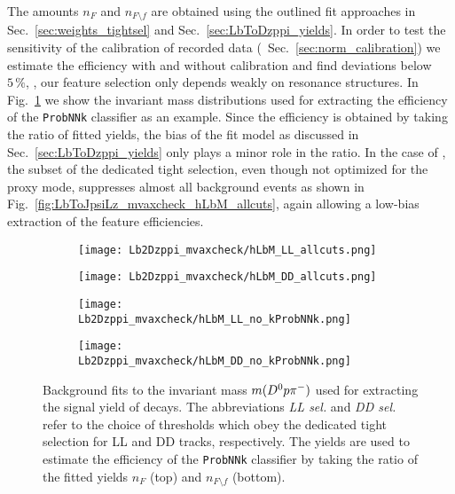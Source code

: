 The amounts $n_F$ and $n_{F \setminus f}$ are obtained using the outlined fit approaches in Sec.~\ref{sec:weights_tightsel} and Sec.~\ref{sec:LbToDzppi_yields}.
In order to test the sensitivity of the calibration of recorded \decay{\Lb}{\Dz\proton\pim} data (\cf{}~Sec.~\ref{sec:norm_calibration}) we estimate the efficiency with and without calibration and find deviations below $5\,\%$, \ie{}, our feature selection only depends weakly on resonance structures.
In Fig.~\ref{fig:LbToDzppi_mvaxcheck_hLbM} we show the invariant mass distributions used for extracting the efficiency of the \texttt{ProbNNk} classifier as an example.
Since the efficiency is obtained by taking the ratio of fitted yields, the bias of the fit model as discussed in Sec.~\ref{sec:LbToDzppi_yields} only plays a minor role in the ratio.
In the case of \decay{\Lb}{\jpsi\Lz}, the subset of the dedicated \decay{\Lb}{\Dz\Lz} tight selection, even though not optimized for the proxy mode, suppresses almost all background events as shown in Fig.~\ref{fig:LbToJpsiLz_mvaxcheck_hLbM_allcuts}, again allowing a low-bias extraction of the feature efficiencies.
\begin{figure}[htbp]
    \centering
    \begin{subfigure}{.49\textwidth}
        \centering
        \texttt{[image: Lb2Dzppi\_mvaxcheck/hLbM\_LL\_allcuts.png]}
    \end{subfigure}
    \begin{subfigure}{.49\textwidth}
        \centering
        \texttt{[image: Lb2Dzppi\_mvaxcheck/hLbM\_DD\_allcuts.png]}
    \end{subfigure}
    \par\bigskip 
    \begin{subfigure}{.49\textwidth}
        \centering
        \texttt{[image: Lb2Dzppi\_mvaxcheck/hLbM\_LL\_no\_kProbNNk.png]}
    \end{subfigure}
    \begin{subfigure}{.49\textwidth}
        \centering
        \texttt{[image: Lb2Dzppi\_mvaxcheck/hLbM\_DD\_no\_kProbNNk.png]}
    \end{subfigure}
    \caption{Background fits to the invariant mass $m({{D}^0}{p}{{\pi}^-})$ used for extracting the signal yield of \decay{\Lb}{\Dz\proton\pim} decays. The abbreviations \textit{LL sel.} and \textit{DD sel.} refer to the choice of thresholds which obey the dedicated \decay{\Lb}{\Dz\Lz} tight selection for \gls{LL} and \gls{DD} tracks, respectively. The yields are used to estimate the efficiency of the \texttt{ProbNNk} classifier by taking the ratio of the fitted yields $n_F$ (top) and $n_{F \setminus f}$ (bottom).}
    \label{fig:LbToDzppi_mvaxcheck_hLbM}
\end{figure}

